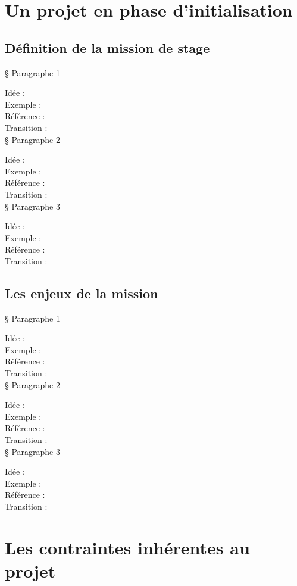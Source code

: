  \section{Un projet en phase d’initialisation}
    \subsection{Définition de la mission de stage}

§ Paragraphe 1

Idée :\\
Exemple :\\
Référence :\\
Transition :\\

§ Paragraphe 2

Idée :\\
Exemple :\\
Référence :\\
Transition :\\

§ Paragraphe 3

Idée :\\
Exemple :\\
Référence :\\
Transition :\\

\subsection{Les enjeux de la mission}

§ Paragraphe 1

Idée :\\
Exemple :\\
Référence :\\
Transition :\\

§ Paragraphe 2

Idée :\\
Exemple :\\
Référence :\\
Transition :\\

§ Paragraphe 3

Idée :\\
Exemple :\\
Référence :\\
Transition :\\


\section{Les contraintes inhérentes au projet}
